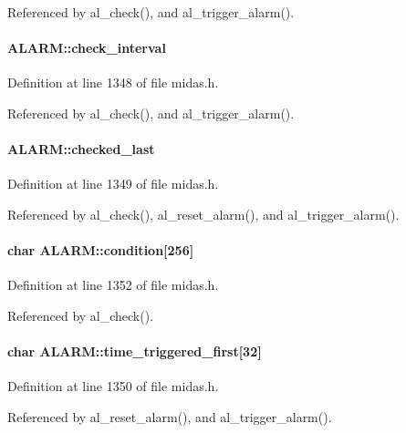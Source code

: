 Referenced by al\_\-check(), and al\_\-trigger\_\-alarm().
\paragraph[{check\_\-interval}]{ {\bf ALARM::check\_\-interval}}\hfill\label{structALARM_a3e29ee1328fd1fa52c7923397be88489}


Definition at line 1348 of file midas.h.

Referenced by al\_\-check(), and al\_\-trigger\_\-alarm().
\paragraph[{checked\_\-last}]{ {\bf ALARM::checked\_\-last}}\hfill\label{structALARM_a53b5d66626b2a59154538b7eccf0da95}


Definition at line 1349 of file midas.h.

Referenced by al\_\-check(), al\_\-reset\_\-alarm(), and al\_\-trigger\_\-alarm().
\paragraph[{condition}]{\setlength{\rightskip}{0pt plus 5cm}char {\bf ALARM::condition}\mbox{[}256\mbox{]}}\hfill\label{structALARM_ad2f752094f921b25ee3b5704bfb0e827}


Definition at line 1352 of file midas.h.

Referenced by al\_\-check().
\paragraph[{time\_\-triggered\_\-first}]{\setlength{\rightskip}{0pt plus 5cm}char {\bf ALARM::time\_\-triggered\_\-first}\mbox{[}32\mbox{]}}\hfill\label{structALARM_a0604590d549357078a21e2bf6ac4a9ca}


Definition at line 1350 of file midas.h.

Referenced by al\_\-reset\_\-alarm(), and al\_\-trigger\_\-alarm().
